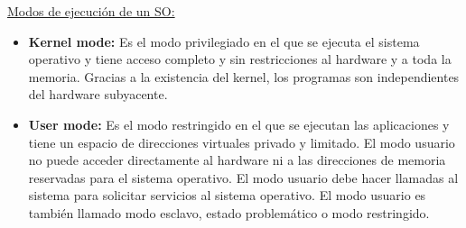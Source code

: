 \documentclass[../main.tex]{subfiles}
\begin{document}
        \underline{Modos de ejecución de un SO:}
        \begin{itemize}
            \item \textbf{Kernel mode:}
                Es el modo privilegiado en el que se ejecuta el sistema operativo y tiene acceso completo y sin restricciones al hardware y a toda la memoria.
                Gracias a la existencia del kernel, los programas son independientes del hardware subyacente.
            \item \textbf{User mode:}
                Es el modo restringido en el que se ejecutan las aplicaciones y tiene un espacio de direcciones virtuales privado y limitado. El modo usuario no puede acceder directamente al hardware ni a las direcciones de memoria reservadas para el sistema operativo. El modo usuario debe hacer llamadas al sistema para solicitar servicios al sistema operativo. El modo usuario es también llamado modo esclavo, estado problemático o modo restringido.
        \end{itemize}
      
        
\end{document}
